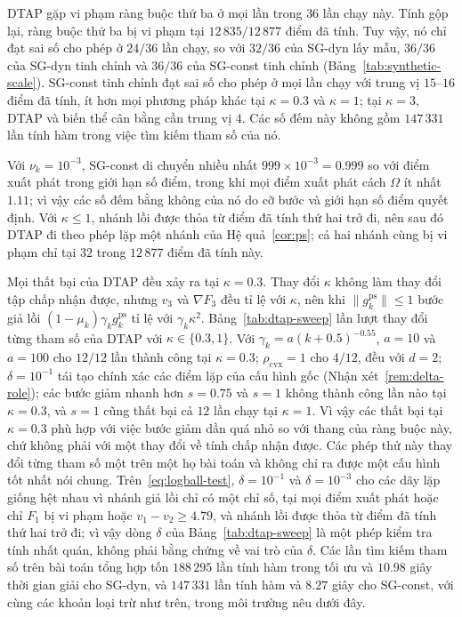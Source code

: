 \documentclass[]{interact}
\theoremstyle{plain}
\theoremstyle{definition}
\theoremstyle{remark}
\newcommand{\cvx}{\mathrm{cvx}}
\newcommand{\ps}{\mathrm{ps}}
\begin{document}
DTAP gặp vi phạm ràng buộc thứ ba ở mọi lần trong $36$
lần chạy này. Tính gộp lại, ràng buộc thứ ba bị vi phạm tại $12\,835/12\,877$ điểm đã tính.
Tuy vậy, nó chỉ đạt sai số cho phép ở $24/36$ lần chạy, so
với $32/36$ của SG-dyn lấy mẫu, $36/36$ của SG-dyn tinh chỉnh và $36/36$ của SG-const
tinh chỉnh (Bảng~\ref{tab:synthetic-scale}).
SG-const tinh chỉnh đạt sai số cho phép ở mọi lần chạy với trung vị $15$--$16$
điểm đã tính, ít hơn mọi phương pháp khác tại $\kappa=0.3$ và $\kappa=1$; tại
$\kappa=3$, DTAP và biến thể cân bằng cần trung vị $4$. Các số đếm này
không gồm $147\,331$ lần tính hàm trong việc tìm kiếm tham số của nó.

Với $\nu_k=10^{-3}$, SG-const di chuyển nhiều nhất $999\times10^{-3}=0.999$ so với điểm xuất phát
trong giới hạn số điểm, trong khi mọi điểm xuất phát cách
$\Omega$ ít nhất $1.11$; vì vậy các số đếm bằng không của nó do cỡ bước và giới hạn số điểm quyết định.
Với $\kappa\le1$, nhánh lồi được thỏa từ điểm đã tính thứ hai trở đi,
nên sau đó DTAP đi theo phép lặp một nhánh của Hệ quả~\ref{cor:ps}; cả hai nhánh
cùng bị vi phạm chỉ tại $32$ trong $12\,877$ điểm đã tính này.

Mọi thất bại của DTAP đều xảy ra tại $\kappa=0.3$. Thay đổi $\kappa$ không làm thay đổi tập chấp nhận được,
nhưng $v_3$ và $\nabla F_3$ đều tỉ lệ với $\kappa$, nên khi
$\|g^{\ps}_k\|\le1$ bước giả lồi $(1-\mu_k)\gamma_k g^{\ps}_k$ tỉ lệ với
$\gamma_k\kappa^2$. Bảng~\ref{tab:dtap-sweep} lần lượt thay đổi từng tham số của DTAP
với $\kappa\in\{0.3,1\}$. Với $\gamma_k=a(k+0.5)^{-0.55}$, $a=10$ và $a=100$ cho
$12/12$ lần thành công tại $\kappa=0.3$; $\rho_{\cvx}=1$ cho $4/12$, đều với $d=2$;
$\delta=10^{-1}$ tái tạo chính xác các điểm lặp của cấu hình gốc (Nhận xét~\ref{rem:delta-role}); các
bước giảm nhanh hơn $s=0.75$ và $s=1$ không thành công lần nào tại $\kappa=0.3$, và
$s=1$ cũng thất bại cả $12$ lần chạy tại $\kappa=1$. Vì vậy các thất bại tại $\kappa=0.3$
phù hợp với việc bước giảm dần quá nhỏ so với thang của ràng buộc
này, chứ không phải với một thay đổi về tính chấp nhận được. Các phép thử này thay đổi
từng tham số một trên một họ bài toán và không chỉ ra được một cấu hình
tốt nhất nói chung.
Trên~\eqref{eq:logball-test}, $\delta=10^{-1}$ và $\delta=10^{-3}$ cho các dãy lặp giống hệt nhau vì
nhánh giả lồi chỉ có một chỉ số, tại mọi điểm xuất phát hoặc chỉ $F_1$ bị vi phạm hoặc
$v_1-v_2\ge4.79$, và nhánh lồi được thỏa từ điểm đã tính thứ hai trở đi; vì vậy
dòng $\delta$ của Bảng~\ref{tab:dtap-sweep} là một phép kiểm tra tính nhất quán, không phải bằng chứng về
vai trò của $\delta$.
Các lần tìm kiếm tham số trên bài toán tổng hợp tốn $188\,295$ lần tính hàm trong tối ưu và
$10.98$ giây thời gian giải cho SG-dyn, và $147\,331$ lần tính hàm và $8.27$
giây cho SG-const, với cùng các khoản loại trừ như trên, trong môi trường
nêu dưới đây.
\end{document}
